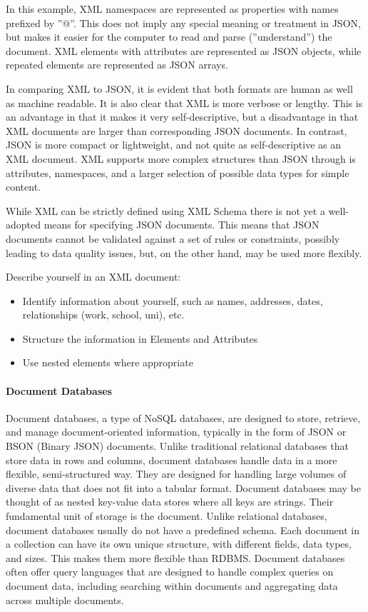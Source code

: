 In this example, XML namespaces are represented as properties with names prefixed by ''@''. This does not imply any special meaning or treatment in JSON, but makes it easier for the computer to read and parse (''understand'') the document. XML elements with attributes are represented as JSON objects, while repeated elements are represented as JSON arrays. 

In comparing XML to JSON, it is evident that both formats are human as well as machine readable. It is also clear that XML is more verbose or lengthy. This is an advantage in that it makes it very self-descriptive, but a disadvantage in that XML documents are larger than corresponding JSON documents. In contrast, JSON is more compact or lightweight, and not quite as self-descriptive as an XML document. XML supports more complex structures than JSON through is attributes, namespaces, and a larger selection of possible data types for simple content. 

While XML can be strictly defined using XML Schema there is not yet a well-adopted means for specifying JSON documents. This means that JSON documents cannot be validated against a set of rules or constraints, possibly leading to data quality issues, but, on the other hand, may be used more flexibly.

\begin{exerciseboxpaper}

Describe yourself in an XML document:
\begin{itemize}
	\item Identify information about yourself, such as names, addresses, dates, relationships (work, school, uni), etc.
	\item Structure the information in Elements and Attributes 
	\item Use nested elements where appropriate
\end{itemize}
\end{exerciseboxpaper}

\paragraph*{Document Databases}

Document databases, a type of NoSQL databases, are designed to store, retrieve, and manage document-oriented information, typically in the form of JSON or BSON (Binary JSON) documents. Unlike traditional relational data\-bases that store data in rows and columns, document databases handle data in a more flexible, semi-structured way. They are designed for handling large volumes of diverse data that does not fit into a tabular format. Document databases may be thought of as nested key-value data stores where all keys are strings. Their fundamental unit of storage is the document. Unlike relational databases, document databases usually do not have a predefined schema. Each document in a collection can have its own unique structure, with different fields, data types, and sizes. This makes them more flexible than RDBMS. Document databases often offer query languages that are designed to handle complex queries on document data, including searching within documents and aggregating data across multiple documents. 

